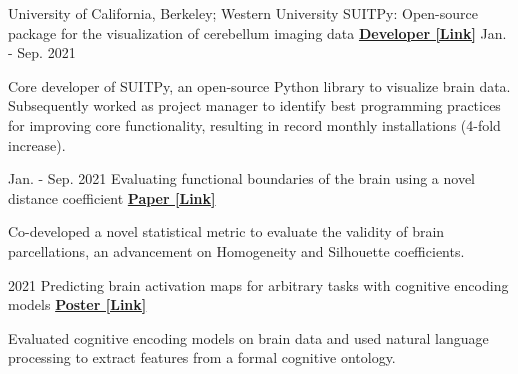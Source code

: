 


\begin{cventries}
    
  \cventry
    {University of California, Berkeley; Western University} %
  	{SUITPy: Open-source package for the visualization of cerebellum imaging data} %
  	{\href{https://suitpy.readthedocs.io/en/latest/}{\textbf{Developer [Link]}}}
  	{Jan. - Sep. 2021}
    {
      \begin{cvitems} %
      	\item {Core developer of SUITPy, an open-source Python library to visualize brain data. Subsequently worked as project manager to identify best programming practices for improving core functionality, resulting in record monthly installations (4-fold increase).}
      \end{cvitems}
    }
    
  \cventry
    {Jan. - Sep. 2021} %
    {Evaluating functional boundaries of the brain using a novel distance coefficient} %
    {\href{https://www.biorxiv.org/content/10.1101/2021.05.11.443151v1.full.pdf}{\textbf{Paper [Link]}}}
    {}
    {
      \begin{cvitems} %
        \item {Co-developed a novel statistical metric to evaluate the validity of brain parcellations, an advancement on Homogeneity and Silhouette coefficients.}
      \end{cvitems}
    }
    
 \cventry
    {2021} %
    {Predicting brain activation maps for arbitrary tasks with cognitive encoding models} %
    {\href{https://drive.google.com/file/d/1dRNSsRzGSSF9QJLJv_jK1R7BmmWfOsMt/view}{\textbf{Poster [Link]}}}
    {}
    {
      \begin{cvitems} %
      	\item {Evaluated cognitive encoding models on brain data and used natural language processing to extract features from a formal cognitive ontology.}
      \end{cvitems}
    }     


\end{cventries}
